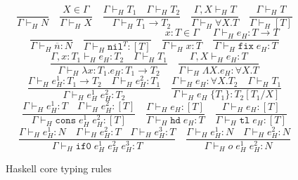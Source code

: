 \begin{figure}
\[
\frac{}{\Gamma\vdash_{H}N}
\quad
\frac{X\in\Gamma}{\Gamma\vdash_{H}X}
\quad
\frac{\Gamma\vdash_{H}T_{1}\quad\Gamma\vdash_{H}T_{2}}{\Gamma\vdash_{H}T_{1}\rightarrow T_{2}}
\quad
\frac{\Gamma ,X\vdash_{H}T}{\Gamma\vdash_{H}\forall X.T}
\quad
\frac{\Gamma\vdash_{H}T}{\Gamma\vdash_{H}[T]}
\]
\bigskip
\[
\frac{}{\Gamma\vdash_{H}\overline{n}:N}
\quad
\frac{}{\Gamma\vdash_{H}\mathtt{nil}^{T}:[T]}
\quad
\frac{x:T\in\Gamma}{\Gamma\vdash_{H}x:T}
\quad
\frac{\Gamma\vdash_{H}e_{H}:T\rightarrow T}{\Gamma\vdash_{H}\mathtt{fix}\;e_{H}:T}
\]
\[
\frac{\Gamma,x:T_{1}\vdash_{H}e_{H}:T_{2}\quad\Gamma\vdash_{H}T_{1}}{\Gamma\vdash_{H}\lambda x:T_{1}.e_{H}:T_{1}\rightarrow T_{2}}
\quad
\frac{\Gamma,X\vdash_{H}e_{H}:T}{\Gamma\vdash_{H}\Lambda X.e_{H}:\forall X.T}
\]
\[
\frac{\Gamma\vdash_{H}e_{H}^{1}:T_{1}\rightarrow T_{2}\quad\Gamma\vdash_{H}e_{H}^{2}:T_{1}}{\Gamma\vdash_{H}e_{H}^{1}\;e_{H}^{2}:T_{2}}
\quad
\frac{\Gamma\vdash_{H}e_{H}:\forall X.T_{2}\quad\Gamma\vdash_{H}T_{1}}{\Gamma\vdash_{H}e_{H}\;\lbrace T_{1}\rbrace:T_{2}[T_{1}/X]}
\]
\[
\frac{\Gamma\vdash_{H}e_{H}^{1}:T\quad\Gamma\vdash_{H}e_{H}^{2}:[T]}{\Gamma\vdash_{H}\mathtt{cons}\;e_{H}^{1}\;e_{H}^{2}:[T]}
\quad
\frac{\Gamma\vdash_{H}e_{H}:[T]}{\Gamma\vdash_{H}\mathtt{hd}\;e_{H}:T}
\quad
\frac{\Gamma\vdash_{H}e_{H}:[T]}{\Gamma\vdash_{H}\mathtt{tl}\;e_{H}:[T]}
\]
\[
\frac{\Gamma\vdash_{H}e_{H}^{1}:N\quad\Gamma\vdash_{H}e_{H}^{2}:T\quad\Gamma\vdash_{H}e_{H}^{3}:T}{\Gamma\vdash_{H}\mathtt{if0}\;e_{H}^{1}\;e_{H}^{2}\;e_{H}^{3}:T}
\quad
\frac{\Gamma\vdash_{H}e_{H}^{1}:N\quad\Gamma\vdash_{H}e_{H}^{2}:N}{\Gamma\vdash_{H}o\;e_{H}^{1}\;e_{H}^{2}:N}
\]
\caption{Haskell core typing rules}
\label{hctr}
\end{figure}